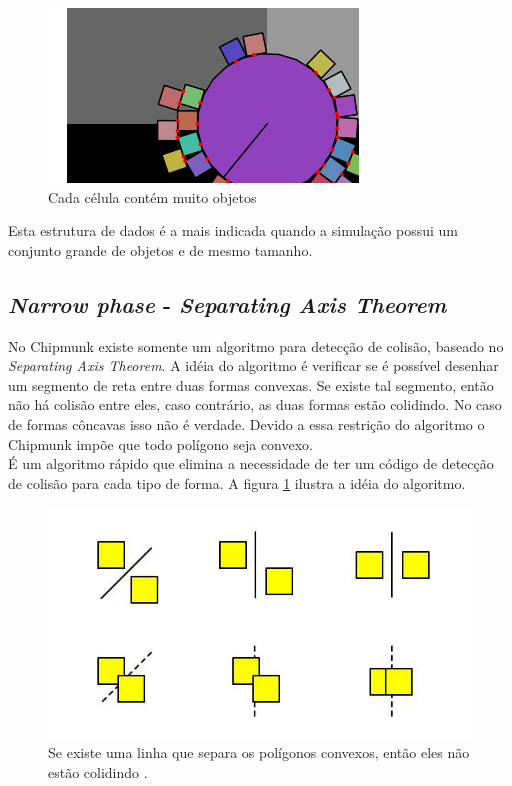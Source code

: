 \begin{figure}[!htbp]
  \centering
  \includegraphics[scale=1]{hash_too_big.png}
\caption{Cada célula contém muito objetos \protect\cite{Chipmunk:image3}}
\end{figure}

Esta estrutura de dados é a mais indicada quando a simulação possui um conjunto grande de objetos e de mesmo tamanho.

\subsection{\textit{Narrow phase} - \textit{Separating Axis Theorem}}

No Chipmunk existe somente um algoritmo para detecção de colisão, baseado no \textit{Separating Axis Theorem}. A idéia do algoritmo é verificar se é possível desenhar um segmento 
de reta entre duas formas convexas. Se existe tal segmento, então não há colisão entre eles, caso contrário, as duas formas estão colidindo. No caso de formas
côncavas isso não é verdade. Devido a essa restrição do algoritmo o Chipmunk impõe que todo polígono seja convexo. \\

É um algoritmo rápido que elimina a necessidade de ter um código de detecção de colisão para cada tipo de forma. A figura \ref{narrow} ilustra a idéia do algoritmo.

\begin{figure}[!htbp]
  \centering
  \includegraphics[scale=0.5]{SAT.jpg}
  \caption{Se existe uma linha que separa os polígonos convexos, então eles não estão colidindo \protect\cite{narrow:sat}.}
  \label{narrow}
\end{figure}
